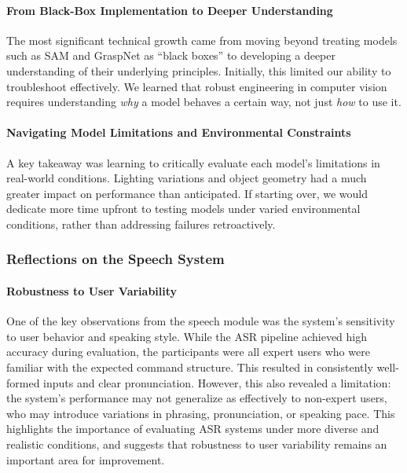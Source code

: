 \documentclass[12pt]{extarticle}
\begin{document}
\paragraph{From Black-Box Implementation to Deeper Understanding}
The most significant technical growth came from moving beyond treating models such as SAM and GraspNet as ``black boxes'' to developing a deeper understanding of their underlying principles. Initially, this limited our ability to troubleshoot effectively. We learned that robust engineering in computer vision requires understanding \textit{why} a model behaves a certain way, not just \textit{how} to use it.

\paragraph{Navigating Model Limitations and Environmental Constraints}
A key takeaway was learning to critically evaluate each model's limitations in real-world conditions. Lighting variations and object geometry had a much greater impact on performance than anticipated. If starting over, we would dedicate more time upfront to testing models under varied environmental conditions, rather than addressing failures retroactively.

\subsubsection{Reflections on the Speech System}

\paragraph{Robustness to User Variability}
One of the key observations from the speech module was the system’s sensitivity to user behavior and speaking style. While the ASR pipeline achieved high accuracy during evaluation, the participants were all expert users who were familiar with the expected command structure. This resulted in consistently well-formed inputs and clear pronunciation. However, this also revealed a limitation: the system’s performance may not generalize as effectively to non-expert users, who may introduce variations in phrasing, pronunciation, or speaking pace. This highlights the importance of evaluating ASR systems under more diverse and realistic conditions, and suggests that robustness to user variability remains an important area for improvement.
\end{document}

